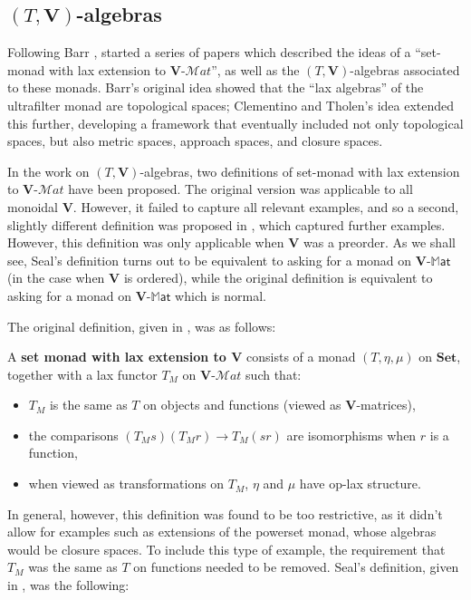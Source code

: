 \documentclass{tac}
\makeatletter
\newcommand{\mb}[1]{{\mathbf{#1}}}
\newcommand{\mat}[1]{\mathbf{#1}\mbox{-}\mathcal{M}\mathit{at}}
\newcommand{\MAT}[1]{\mathbf{#1}\mbox{-}\mathbb{M}\mathsf{at}}
\numberwithin{equation}{section}
\def\currthmtype{}
\let\old@label\label
\def\label#1{%
    {\let\your@currentlabel\@currentlabel%
      \edef\@currentlabel{\currthmtype}%
      \old@label{label@name@#1}}%
    \old@label{#1}}
\newenvironment{packeditem}{%
  \begin{itemize}%
    \setlength{\itemsep}{0pt}%
    \setlength{\topsep}{0pt}%
}{\end{itemize}}
\makeatother
\begin{document}
\subsection{$(T,\mb{V})$-algebras}
\label{sectiontv}

Following Barr \cite{RelationalAlgebras}, \cite{CommonApproach} started
a series of papers which described the ideas of a ``set-monad with lax
extension to $\mat{V}$'', as well as the $(T, \mb{V})$-algebras
associated to these monads.  Barr's original idea showed that the ``lax
algebras'' of the ultrafilter monad are topological spaces; Clementino
and Tholen's idea extended this further, developing a framework that
eventually included not only topological spaces, but also metric spaces,
approach spaces, and closure spaces.

In the work on $(T,\mb{V})$-algebras, two definitions of set-monad with
lax extension to $\mat{V}$ have been proposed.  The original version was
applicable to all monoidal $\mb{V}$.  However, it failed to capture all
relevant examples, and so a second, slightly different definition was
proposed in \cite{SealCanonical}, which captured further examples.
However, this definition was only applicable when $\mb{V}$ was a
preorder.  As we shall see, Seal's definition turns out to be equivalent
to asking for a monad on $\MAT{V}$ (in the case when $\mb{V}$ is
ordered), while the original definition is equivalent to asking for a
monad on $\MAT{V}$ which is normal.

The original definition, given in \cite{CommonApproach}, was as follows:

\begin{definition}
A \textbf{set monad with lax extension to $\mb{V}$} consists of a monad
$(T, \eta, \mu)$ on $\mb{Set}$, together with a lax functor $T_M$ on
$\mat{V}$ such that:
\begin{packeditem}
	\item $T_M$ is the same as $T$ on objects and functions (viewed as $\mb{V}$-matrices),
	\item the comparisons $(T_Ms)(T_Mr) \to T_M(sr)$ are isomorphisms when $r$ is a function, 
	\item when viewed as transformations on $T_M$, $\eta$ and $\mu$ have op-lax structure.
\end{packeditem}
\end{definition}

In general, however, this definition was found to be too restrictive, as
it didn't allow for examples such as extensions of the powerset monad,
whose algebras would be closure spaces.  To include this type of
example, the requirement that $T_M$ was the same as $T$ on functions
needed to be removed.  Seal's definition, given in \cite{SealCanonical},
was the following:
\end{document}
